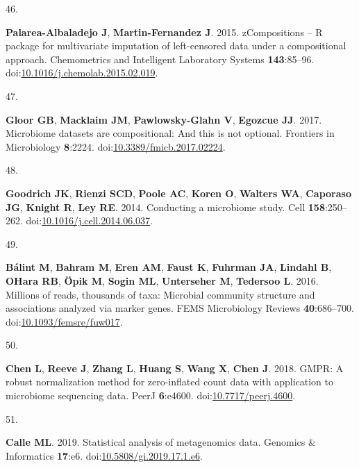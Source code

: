 \documentclass[
]{article}
\newlength{\cslhangindent}
\newlength{\csllabelwidth}
\newlength{\cslentryspacingunit} %
\newenvironment{CSLReferences}[2] %
 {%
  \setlength{\parindent}{0pt}
  \ifodd #1
  \let\oldpar\par
  \def\par{\hangindent=\cslhangindent\oldpar}
  \fi
  \setlength{\parskip}{#2\cslentryspacingunit}
 }%
 {}
\newcommand{\CSLLeftMargin}[1]{\parbox[t]{\csllabelwidth}{#1}}
\newcommand{\CSLRightInline}[1]{\parbox[t]{\linewidth - \csllabelwidth}{#1}\break}
\begin{document}
\begin{CSLReferences}{0}{1}
\leavevmode{}%
\CSLLeftMargin{46. }%
\CSLRightInline{\textbf{Palarea-Albaladejo J}, \textbf{Martin-Fernandez
J}. 2015. zCompositions -- {R} package for multivariate imputation of
left-censored data under a compositional approach. Chemometrics and
Intelligent Laboratory Systems \textbf{143}:85--96.
doi:\href{https://doi.org/10.1016/j.chemolab.2015.02.019}{10.1016/j.chemolab.2015.02.019}.}

\leavevmode{}%
\CSLLeftMargin{47. }%
\CSLRightInline{\textbf{Gloor GB}, \textbf{Macklaim JM},
\textbf{Pawlowsky-Glahn V}, \textbf{Egozcue JJ}. 2017. Microbiome
datasets are compositional: And this is not optional. Frontiers in
Microbiology \textbf{8}:2224.
doi:\href{https://doi.org/10.3389/fmicb.2017.02224}{10.3389/fmicb.2017.02224}.}

\leavevmode{}%
\CSLLeftMargin{48. }%
\CSLRightInline{\textbf{Goodrich JK}, \textbf{Rienzi SCD}, \textbf{Poole
AC}, \textbf{Koren O}, \textbf{Walters WA}, \textbf{Caporaso JG},
\textbf{Knight R}, \textbf{Ley RE}. 2014. Conducting a microbiome study.
Cell \textbf{158}:250--262.
doi:\href{https://doi.org/10.1016/j.cell.2014.06.037}{10.1016/j.cell.2014.06.037}.}

\leavevmode{}%
\CSLLeftMargin{49. }%
\CSLRightInline{\textbf{Bálint M}, \textbf{Bahram M}, \textbf{Eren AM},
\textbf{Faust K}, \textbf{Fuhrman JA}, \textbf{Lindahl B}, \textbf{OHara
RB}, \textbf{Öpik M}, \textbf{Sogin ML}, \textbf{Unterseher M},
\textbf{Tedersoo L}. 2016. Millions of reads, thousands of taxa:
Microbial community structure and associations analyzed via marker
genes. {FEMS} Microbiology Reviews \textbf{40}:686--700.
doi:\href{https://doi.org/10.1093/femsre/fuw017}{10.1093/femsre/fuw017}.}

\leavevmode{}%
\CSLLeftMargin{50. }%
\CSLRightInline{\textbf{Chen L}, \textbf{Reeve J}, \textbf{Zhang L},
\textbf{Huang S}, \textbf{Wang X}, \textbf{Chen J}. 2018. {GMPR}: A
robust normalization method for zero-inflated count data with
application to microbiome sequencing data. {PeerJ} \textbf{6}:e4600.
doi:\href{https://doi.org/10.7717/peerj.4600}{10.7717/peerj.4600}.}

\leavevmode{}%
\CSLLeftMargin{51. }%
\CSLRightInline{\textbf{Calle ML}. 2019. Statistical analysis of
metagenomics data. Genomics {\&} Informatics \textbf{17}:e6.
doi:\href{https://doi.org/10.5808/gi.2019.17.1.e6}{10.5808/gi.2019.17.1.e6}.}


\end{CSLReferences}
\end{document}
